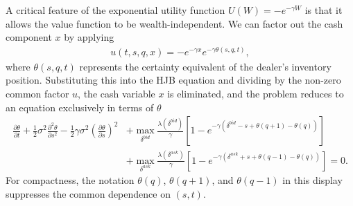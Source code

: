 A critical feature of the exponential utility function $U(W) = -e^{-\gamma W}$ is that it allows the value function to be wealth-independent. We can factor out the cash component $x$ by applying
\begin{align*}
    u(t,s,q,x) = -e^{-\gamma x}e^{-\gamma \theta(s,q,t)},
\end{align*}
where $\theta(s,q,t)$ represents the certainty equivalent of the dealer's inventory position. Substituting this into the HJB equation and dividing by the non-zero common factor $u$, the cash variable $x$ is eliminated, and the problem reduces to an equation exclusively in terms of $\theta$
\begin{align*}
    \frac{\partial \theta}{\partial t} + \frac{1}{2}\sigma^2 \frac{\partial^2 \theta}{\partial s^2} - \frac{1}{2}\gamma \sigma^2 \left(\frac{\partial \theta}{\partial s}\right)^2 &+ \max_{\delta^{bid}} \frac{\lambda(\delta^{bid})}{\gamma} \left[ 1 - e^{-\gamma (\delta^{bid} - s + \theta(q+1) - \theta(q))} \right] \\
    &+ \max_{\delta^{ask}} \frac{\lambda(\delta^{ask})}{\gamma} \left[ 1 - e^{-\gamma (\delta^{ask} + s + \theta(q-1) - \theta(q))} \right] = 0.
\end{align*}
For compactness, the notation $\theta(q)$, $\theta(q+1)$, and $\theta(q-1)$ in this display suppresses the common dependence on $(s,t)$.

